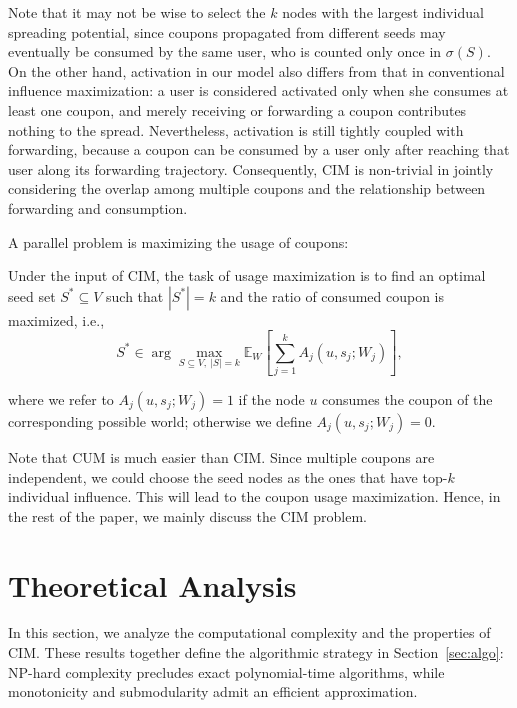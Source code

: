 \documentclass[sigconf]{acmart}
\begin{document}
Note that it may not be wise to select the $k$ nodes with the largest
individual spreading potential, since coupons propagated from
different seeds may eventually be consumed by the same user, who is
counted only once in $\sigma(S)$.
On the other hand, activation in our model also differs from that in
conventional influence maximization: a user is considered activated
only when she consumes at least one coupon, and merely receiving or
forwarding a coupon contributes nothing to the spread.
Nevertheless, activation is still tightly coupled with forwarding,
because a coupon can be consumed by a user only after reaching that
user along its forwarding trajectory.
Consequently, CIM is non-trivial in jointly considering the overlap
among multiple coupons and the relationship between forwarding and
consumption.


A parallel problem is maximizing the usage of coupons:
\begin{definition}
\label{def:cum}
Under the input of CIM,
the task of usage maximization is to find an
optimal seed set $S^*\subseteq V$ such that $|S^*|=k$ and the ratio of consumed coupon
 is maximized, i.e.,
\begin{equation}
\label{eq:cum}
S^*
\in
\arg\max_{S\subseteq V,\ |S|=k}
\mathbb{E}_{W}[\sum_{j=1}^{k} A_j(u,s_j;W_j)],
\end{equation}
\end{definition}
where we refer to $A_j(u,s_j;W_j)=1$ if the node $u$ consumes the coupon of the corresponding possible world; otherwise we define $A_j(u,s_j;W_j)=0$.

Note that CUM is much easier than CIM. Since multiple coupons are independent, we could choose the seed nodes as the ones that have top-$k$ individual influence. This will lead to the coupon usage maximization. Hence, in the rest of the paper, we mainly discuss the CIM problem.



\section{Theoretical Analysis}
\label{sec:theory}

In this section, we analyze the computational complexity and the
properties of CIM.
These results together define the algorithmic strategy in
Section~\ref{sec:algo}: NP-hard complexity precludes exact polynomial-time
algorithms, while monotonicity and submodularity admit an efficient
approximation.
\end{document}
